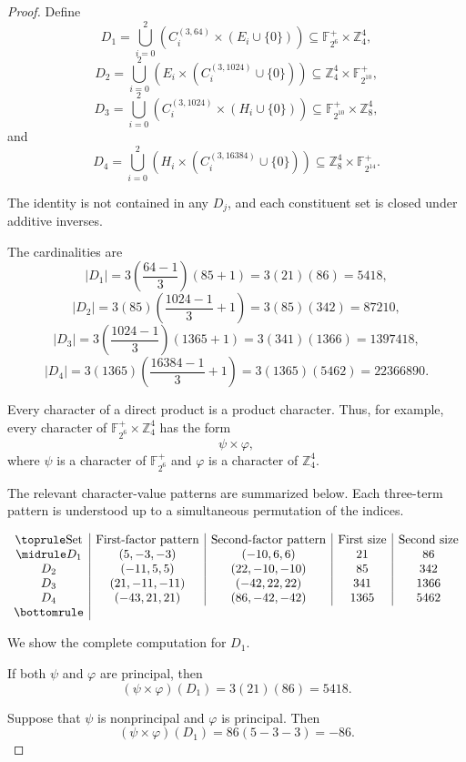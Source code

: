 \documentclass[11pt]{article}
\theoremstyle{definition}
\theoremstyle{remark}
\newcommand{\F}{\mathbb{F}}
\newcommand{\Z}{\mathbb{Z}}
\begin{document}
\begin{proof}
Define
\[
D_1
=
\bigcup_{i=0}^{2}
\left(
C_i^{(3,64)}
\times
(E_i\cup\{0\})
\right)
\subseteq
\F_{2^6}^+\times\Z_4^4,
\]
\[
D_2
=
\bigcup_{i=0}^{2}
\left(
E_i
\times
(C_i^{(3,1024)}\cup\{0\})
\right)
\subseteq
\Z_4^4\times\F_{2^{10}}^+,
\]
\[
D_3
=
\bigcup_{i=0}^{2}
\left(
C_i^{(3,1024)}
\times
(H_i\cup\{0\})
\right)
\subseteq
\F_{2^{10}}^+\times\Z_8^4,
\]
and
\[
D_4
=
\bigcup_{i=0}^{2}
\left(
H_i
\times
(C_i^{(3,16384)}\cup\{0\})
\right)
\subseteq
\Z_8^4\times\F_{2^{14}}^+.
\]

The identity is not contained in
any \(D_j\), and each constituent set is closed under additive
inverses.

The cardinalities are
\[
|D_1|
=
3\left(\frac{64-1}{3}\right)(85+1)
=
3(21)(86)
=
5418,
\]
\[
|D_2|
=
3(85)
\left(\frac{1024-1}{3}+1\right)
=
3(85)(342)
=
87210,
\]
\[
|D_3|
=
3\left(\frac{1024-1}{3}\right)(1365+1)
=
3(341)(1366)
=
1397418,
\]
\[
|D_4|
=
3(1365)
\left(\frac{16384-1}{3}+1\right)
=
3(1365)(5462)
=
22366890.
\]

Every character of a direct product is a product character. Thus,
for example, every character of
\(\F_{2^6}^+\times\Z_4^4\)
has the form
\[
\psi\times\varphi,
\]
where \(\psi\) is a character of \(\F_{2^6}^+\) and \(\varphi\)
is a character of \(\Z_4^4\).

The relevant character-value patterns are summarized below. Each
three-term pattern is understood up to a simultaneous permutation of
the indices.

\[
\begin{array}{c|c|c|c|c}
\toprule
\text{Set}
&
\text{First-factor pattern}
&
\text{Second-factor pattern}
&
\text{First size}
&
\text{Second size}
\\
\midrule
D_1
&
(5,-3,-3)
&
(-10,6,6)
&
21
&
86
\\
D_2
&
(-11,5,5)
&
(22,-10,-10)
&
85
&
342
\\
D_3
&
(21,-11,-11)
&
(-42,22,22)
&
341
&
1366
\\
D_4
&
(-43,21,21)
&
(86,-42,-42)
&
1365
&
5462
\\
\bottomrule
\end{array}
\]

We show the complete computation for \(D_1\).

If both \(\psi\) and \(\varphi\) are principal, then
\[
(\psi\times\varphi)(D_1)
=
3(21)(86)
=
5418.
\]

Suppose that \(\psi\) is nonprincipal and \(\varphi\) is principal.
Then
\[
(\psi\times\varphi)(D_1)
=
86(5-3-3)
=
-86.
\]


\end{proof}
\end{document}
